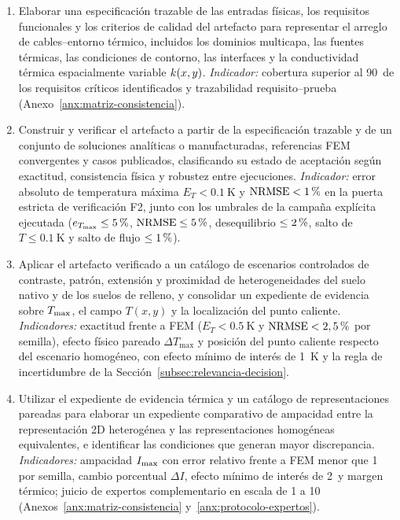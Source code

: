 \begin{enumerate}[label=OE\arabic*.]
  \item Elaborar una especificación trazable de las entradas físicas, los requisitos funcionales y los criterios de calidad del artefacto para representar el arreglo de cables--entorno térmico, incluidos los dominios multicapa, las fuentes térmicas, las condiciones de contorno, las interfaces y la conductividad térmica espacialmente variable $k(x,y)$. \textit{Indicador:} cobertura superior al 90\,\pct{} de los requisitos críticos identificados y trazabilidad requisito--prueba (Anexo~\ref{anx:matriz-consistencia}).
  \item Construir y verificar el artefacto a partir de la especificación trazable y de un conjunto de soluciones analíticas o manufacturadas, referencias FEM convergentes y casos publicados, clasificando su estado de aceptación según exactitud, consistencia física y robustez entre ejecuciones. \textit{Indicador:} error absoluto de temperatura máxima $E_T < \SI{0,1}{\kelvin}$ y $\mathrm{NRMSE} < 1\,\pct{}$ en la puerta estricta de verificación F2, junto con los umbrales de la campaña explícita ejecutada ($e_{\Tmax} \le 5\,\pct{}$, $\mathrm{NRMSE} \le 5\,\pct{}$, desequilibrio $\le 2\,\pct{}$, salto de $T \le \SI{0,1}{\kelvin}$ y salto de flujo $\le 1\,\pct{}$).
  \item Aplicar el artefacto verificado a un catálogo de escenarios controlados de contraste, patrón, extensión y proximidad de heterogeneidades del suelo nativo y de los suelos de relleno, y consolidar un expediente de evidencia sobre $T_{\max}$, el campo $T(x,y)$ y la localización del punto caliente. \textit{Indicadores:} exactitud frente a FEM ($E_T < \SI{0,5}{\kelvin}$ y $\mathrm{NRMSE} < 2,5\,\pct{}$ por semilla), efecto físico pareado $\Delta T_{\max}$ y posición del punto caliente respecto del escenario homogéneo, con efecto mínimo de interés de \SI{1}{\kelvin} y la regla de incertidumbre de la Sección~\ref{subsec:relevancia-decision}.
  \item Utilizar el expediente de evidencia térmica y un catálogo de representaciones pareadas para elaborar un expediente comparativo de ampacidad entre la representación 2D heterogénea y las representaciones homogéneas equivalentes, e identificar las condiciones que generan mayor discrepancia. \textit{Indicadores:} ampacidad $I_{\max}$ con error relativo frente a FEM menor que 1\,\pct{} por semilla, cambio porcentual $\Delta I$, efecto mínimo de interés de 2\,\pct{} y margen térmico; juicio de expertos complementario en escala de 1 a 10 (Anexos~\ref{anx:matriz-consistencia} y~\ref{anx:protocolo-expertos}).
\end{enumerate}

